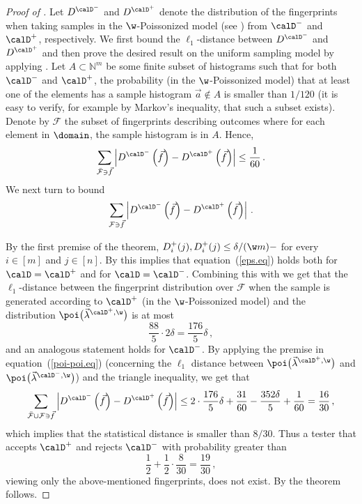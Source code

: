 {\begin{proof}[Proof of ]
%
%
Let $D^{\calD^-}$ and $D^{\calD^+}$ denote the distribution of the fingerprints when taking samples in the $\w$-Poissonized model (see ) from $\calD^-$ and $\calD^+$, respectively.
We first bound the $\ell_1$-distance between $D^{\calD^-}$ and $D^{\calD^+}$ and then prove the desired result on the uniform sampling model by applying .
Let $A\subset \mathbb{N}^m$ be some finite subset of histograms such that for both $\calD^-$ and $\calD^+$, the probability (in the $\w$-Poissonized model) that at least one of the elements has a sample histogram $\vec{a}\notin A$ is smaller than ${1}/{120}$ (it is easy to verify, for example by Markov's inequality, that such a subset exists).
Denote by $\mathcal{F}$ the subset of fingerprints describing outcomes where for each element in $\domain$,  the sample histogram is in $A$.
Hence,
\[
\sum_{\bar{\mathcal{F}} \owns \vec{f}}\left|
  D^{\calD^-}\left(\vec{f}\right) - D^{\calD^+}\left(\vec{f}\right)
\right| \leq \frac{1}{60}\,.
\]
We next turn to bound 
\[
\sum_{\mathcal{F} \owns \vec{f}}\left| D^{\calD^-}\left(\vec{f}\right)
  - D^{\calD^+}\left(\vec{f}\right) \right|\,.
\]

By the first premise of the theorem, $D^+_i(j),D^+_i(j) \leq  {\delta}/{(\w m)-}$
for every $i\in[m]$ and $j \in [n]$.
By  this implies that
equation~(\ref{eps.eq}) holds both for $\calD = \calD^+$ and for
$\calD = \calD^-$.
Combining this with 
we get that the $\ell_1$-distance between the
fingerprint distribution over $\mathcal{F}$ when the sample
is generated according to $\calD^+$ (in the $\w$-Poissonized model) and the
distribution $\poi\bigl(\vec{\lambda}^{\calD^+,\w}\bigr)$
is at most
\[
\frac{88}{5}\cdot 2\delta = \frac{176}{5}\delta\,,
\]
and an analogous statement holds for $\calD^-$.
By applying the premise in equation~(\ref{poi-poi.eq})
(concerning the $\ell_1$ distance between $\poi\bigl(\vec{\lambda}^{\calD^+,\w}\bigr)$
and $\poi\bigl(\vec{\lambda}^{\calD^-,\w}\bigr)$)
and the triangle inequality, we get that
%
%
%
%
%
%
%
%
\[
\sum_{\bar{\mathcal{F}}\cup \mathcal{F} \owns \vec{f}}\left|
  D^{\calD^-}\left(\vec{f}\right) - D^{\calD^+}\left(\vec{f}\right)
\right| \leq 2 \cdot \frac{176}{5}\delta + \frac{31}{60} -
\frac{352\delta}{5} + \frac{1}{60}= \frac{16}{30}\,,
\]
which implies that the statistical distance is smaller than ${8}/{30}$.
Thus a tester that accepts $\calD^+$ and rejects $\calD^-$ with
probability greater than
\[
\frac{1}{2} + \frac{1}{2} \cdot \frac{8}{30}= \frac{19}{30}\,,
\]
viewing only the above-mentioned fingerprints, does not exist.
By  the theorem follows.
\end{proof}
%
%
%
}
%


